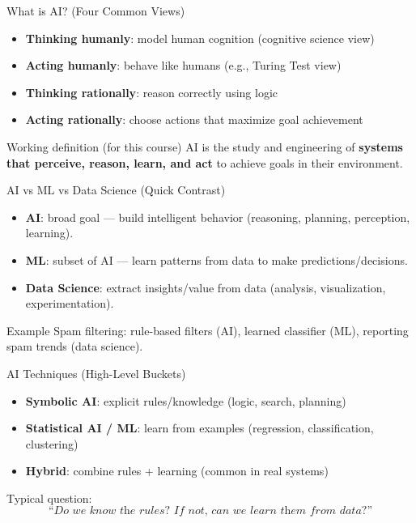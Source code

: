 \documentclass[aspectratio=169]{beamer}
\begin{document}
\begin{frame}{What is AI? (Four Common Views)}
  \begin{itemize}[<+->]
    \item \textbf{Thinking humanly}: model human cognition (cognitive science view)
    \item \textbf{Acting humanly}: behave like humans (e.g., Turing Test view)
    \item \textbf{Thinking rationally}: reason correctly using logic
    \item \textbf{Acting rationally}: choose actions that maximize goal achievement
  \end{itemize}
  \vspace{0.4em}
  \begin{block}{Working definition (for this course)}
    AI is the study and engineering of \textbf{systems that perceive, reason, learn, and act} to achieve goals in their environment.
  \end{block}
\end{frame}

\begin{frame}{AI vs ML vs Data Science (Quick Contrast)}
  \begin{itemize}[<+->]
    \item \textbf{AI}: broad goal --- build intelligent behavior (reasoning, planning, perception, learning).
    \item \textbf{ML}: subset of AI --- learn patterns from data to make predictions/decisions.
    \item \textbf{Data Science}: extract insights/value from data (analysis, visualization, experimentation).
  \end{itemize}
  \vspace{0.4em}
  \begin{exampleblock}{Example}
    Spam filtering: rule-based filters (AI), learned classifier (ML), reporting spam trends (data science).
  \end{exampleblock}
\end{frame}

\begin{frame}{AI Techniques (High-Level Buckets)}
  \begin{itemize}[<+->]
    \item \textbf{Symbolic AI}: explicit rules/knowledge (logic, search, planning)
    \item \textbf{Statistical AI / ML}: learn from examples (regression, classification, clustering)
    \item \textbf{Hybrid}: combine rules + learning (common in real systems)
  \end{itemize}
  \vspace{0.4em}
  Typical question:
  \[
    \textit{``Do we know the rules? If not, can we learn them from data?''}
  \]
\end{frame}
\end{document}
